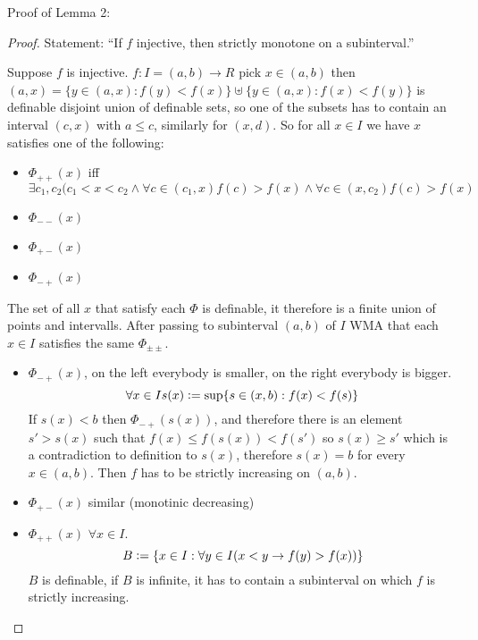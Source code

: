 Proof of Lemma 2:
\begin{proof}
    Statement: ``If $f$ injective, then strictly monotone on a subinterval.''

    Suppose $f$ is injective. $f:I=(a,b)\to R$
    pick $x\in (a,b)$ then $(a,x) = \{y\in (a,x): f(y)<f(x)\} \uplus \{y\in (a,x): f(x)<f(y)\}$ is definable disjoint union of definable sets, so one of the subsets has to contain an interval $(c,x)$ with $a \leq c$, similarly for $(x,d)$.
    So for all $x\in I$ we have $x$ satisfies one of the following:
    \begin{itemize}
        \item $\Phi_{++}(x)$ iff $\exists c_1,c_2 (c_1<x<c_2 \land \forall c \in (c_1,x) f(c)>f(x) \land \forall c\in (x,c_2) f(c)>f(x)$
        \item $\Phi_{--}(x)$
        \item $\Phi_{+-}(x)$
        \item $\Phi_{-+}(x)$
    \end{itemize}
    The set of all $x$ that satisfy each $\Phi$ is definable, it therefore is a finite union of points and intervalls.
    After passing to subinterval $(a,b)$ of $I$ WMA that each $x\in I$ 
    satisfies the same $\Phi_{\pm\pm}$.
    \begin{itemize}
        \item $\Phi_{-+}(x)$, on the left everybody is smaller, on the right everybody is bigger.
        \[\forall x\in I s(x)\vcentcolon= \sup\{s\in(x,b): f(x)<f(s)\}\]
        If $s(x)<b$ then $\Phi_{-+}(s(x))$, and therefore there is an element $s'>s(x)$ such that $f(x)
        \leq f(s(x))<f(s')$ so $s(x)\geq s'$ which is a contradiction to definition to $s(x)$, therefore 
        $s(x) = b$ for every $x\in (a,b)$. Then $f$ has to be strictly increasing on $(a,b)$.
        \item $\Phi_{+-}(x)$ similar  (monotinic decreasing)
        \item $\Phi_{++}(x)$ $\forall x \in I$.
        $$B \vcentcolon= \{x\in I: \forall y\in I (x<y \to f(y)>f(x))\}$$
        $B$ is definable, if $B$ is infinite, it has to contain a subinterval on which $f$ is strictly 
        increasing. 


\end{itemize}
\end{proof}
